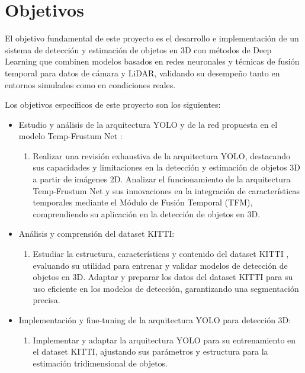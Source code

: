 \section{Objetivos}
\label{sec:objetivos-y-campo}


El objetivo fundamental de este proyecto es el desarrollo e implementación de un sistema de detección y estimación de objetos en 3D con métodos de Deep Learning que combinen modelos basados en redes neuronales y técnicas de fusión temporal para datos de cámara y LiDAR, validando su desempeño tanto en entornos simulados como en condiciones reales.


Los objetivos específicos de este proyecto son los siguientes:
\begin{itemize}
	\item Estudio y análisis de la arquitectura YOLO \cite{yolo} y de la red propuesta en el modelo Temp-Frustum Net \cite{frustum}:
	\begin{enumerate}
		\item Realizar una revisión exhaustiva de la arquitectura YOLO, destacando sus capacidades y limitaciones en la detección y estimación de objetos 3D a partir de imágenes 2D.
		Analizar el funcionamiento de la arquitectura Temp-Frustum Net y sus innovaciones en la integración de características temporales mediante el Módulo de Fusión Temporal (TFM), comprendiendo su aplicación en la detección de objetos en 3D.
	\end{enumerate}
	
	\item Análisis y comprensión del dataset KITTI:
	\begin{enumerate}
		\item Estudiar la estructura, características y contenido del dataset KITTI \cite{kitti}, evaluando su utilidad para entrenar y validar modelos de detección de objetos en 3D.
		Adaptar y preparar los datos del dataset KITTI para su uso eficiente en los modelos de detección, garantizando una segmentación precisa. 
	\end{enumerate}
	
	\item Implementación y fine-tuning de la arquitectura YOLO para detección 3D:
	\begin{enumerate}
		\item Implementar y adaptar la arquitectura YOLO para su entrenamiento en el dataset KITTI, ajustando sus parámetros y estructura para la estimación tridimensional de objetos.
	\end{enumerate}
	

\end{itemize}
